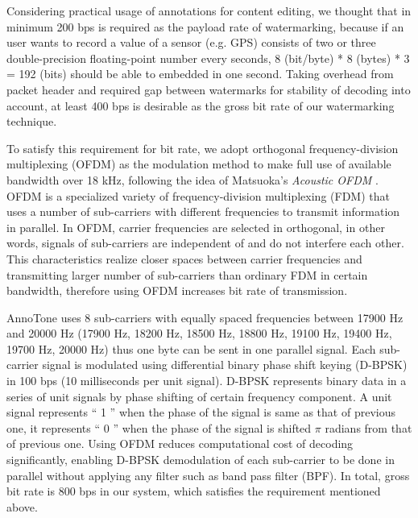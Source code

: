 Considering practical usage of annotations for content editing, we thought that in minimum 200 bps is required as the payload rate of watermarking, because if an user wants to record a value of a sensor (e.g. GPS) consists of two or three double-precision floating-point number every seconds, 8 (bit/byte) * 8 (bytes) * 3 = 192 (bits) should be able to embedded in one second.
Taking overhead from packet header and required gap between watermarks for stability of decoding into account, at least 400 bps is desirable as the gross bit rate of our watermarking technique.

To satisfy this requirement for bit rate, we adopt orthogonal frequency-division multiplexing (OFDM) as the modulation method to make full use of available bandwidth over 18 kHz, following the idea of Matsuoka's {\it Acoustic OFDM} \cite{matsuoka2008acoustic}.
OFDM is a specialized variety of frequency-division multiplexing (FDM) that uses a number of sub-carriers with different frequencies to transmit information in parallel.
In OFDM, carrier frequencies are selected in orthogonal, in other words, signals of sub-carriers are independent of and do not interfere each other.
This characteristics realize closer spaces between carrier frequencies and transmitting larger number of sub-carriers than ordinary FDM in certain bandwidth, therefore using OFDM increases bit rate of transmission.

AnnoTone uses 8 sub-carriers with equally spaced frequencies between 17900 Hz and 20000 Hz (17900 Hz, 18200 Hz, 18500 Hz, 18800 Hz, 19100 Hz, 19400 Hz, 19700 Hz, 20000 Hz) thus one byte can be sent in one parallel signal.
Each sub-carrier signal is modulated using differential binary phase shift keying (D-BPSK) in 100 bps (10 milliseconds per unit signal).
D-BPSK represents binary data in a series of unit signals by phase shifting of certain frequency component.
A unit signal represents `` 1 '' when the phase of the signal is same as that of previous one, it represents `` 0 '' when the phase of the signal is shifted $\pi$ radians from that of previous one.
Using OFDM reduces computational cost of decoding significantly, enabling D-BPSK demodulation of each sub-carrier to be done in parallel without applying any filter such as band pass filter (BPF).
In total, gross bit rate is 800 bps in our system, which satisfies the requirement mentioned above.
